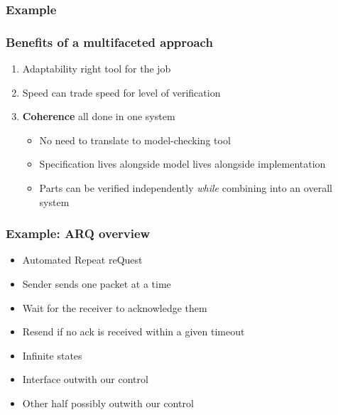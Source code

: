 \documentclass[compress]{beamer}
\begin{document}
\begin{frame}
  \frametitle{Example}

\end{frame}

\begin{frame}
  \frametitle{Benefits of a multifaceted approach}

  \begin{enumerate}
    \item Adaptability {\textemdash} right tool for the job
    \item Speed {\textemdash} can trade speed for level of verification
    \item \textbf{Coherence} {\textemdash} all done in one system
      \begin{itemize}
        \item No need to translate to model-checking tool
        \item Specification lives alongside model lives alongside
              implementation
        \item Parts can be verified independently \emph{while} combining into an
              overall system
      \end{itemize}
  \end{enumerate}

\end{frame}

\begin{frame}
  \frametitle{Example: ARQ {\textendash} overview}


  \begin{itemize}
    \item Automated Repeat reQuest {\textcolor{white}{(of course -\_-)}}
    \item Sender sends one packet at a time
    \item Wait for the receiver to acknowledge them
    \item Resend if no ack is received within a given timeout
  \end{itemize}

  \begin{itemize}
    \item Infinite states
    \item Interface outwith our control
    \item Other half possibly outwith our control
  \end{itemize}

\end{frame}
\end{document}
